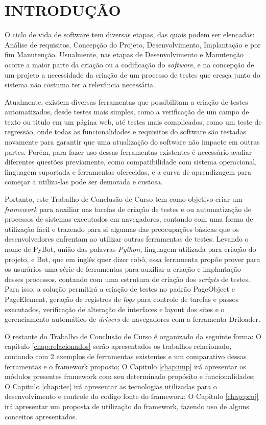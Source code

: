 %
%

\chapter{INTRODUÇÃO}\label{chap:introducao}

O ciclo de vida de software tem diversas etapas, das quais podem ser elencadas: Análise de requisitos, Concepção do Projeto, Desenvolvimento,
Implantação e por fim Manutenção. Usualmente, nas etapas de Desenvolvimento e Manutenção ocorre a maior parte da criação ou a codificação do
\textit{software}, e na concepção de um projeto a necessidade da criação de um processo de testes que cresça junto do sistema não costuma ter
a relevância necessária.

Atualmente, existem diversas ferramentas que possibilitam a criação de testes automatizados, desde testes mais simples, como a verificação de
um campo de texto ou titulo em um  página web, até testes mais complicados, como um teste de regressão, onde todas as funcionalidades e requisitos
do software são testadas novamente para garantir que uma atualização do software não impacte em outras partes. Porém, para fazer uso dessas
ferramentas existentes é necessário avaliar diferentes questões previamente, como compatibilidade com sistema operacional, linguagem suportada
e ferramentas oferecidas, e a curva de aprendizagem para começar a utiliza-las pode ser demorada e custosa.

Portanto, este Trabalho de Conclusão de Curso tem como objetivo criar um \textit{framework} para auxiliar nas tarefas de criação de testes e ou
automatização de processos de sistemas executados em navegadores, contando com uma forma de utilização fácil e trazendo para si algumas das
preocupações básicas que os desenvolvedores enfrentam ao utilizar outras ferramentas de testes. Levando o nome de PyBot, união das palavras \emph{Python},
linguagem utilizada para criação do projeto, e Bot, que em inglês quer dizer robô, essa ferramenta propõe prover para os usurários uma série de
ferramentas para auxiliar a criação e implantação desses processos, contando com uma estrutura de criação dos \emph{scripts} de testes. Para isso,
a solução permitirá a criação de testes no padrão PageObject e PageElement, geração de registros de \emph{logs} para controle de tarefas e passos
executados, verificação de alteração de interfaces e layout dos sites e o gerenciamento automático de \emph{drivers} de navegadores com a ferramenta Driloader.


O restante do Trabalho de Conclusão de Curso é organizado da seguinte forma:
O capítulo \ref{chap:relacionados} serão apresentados os trabalhos relacionado, contando com 2 exemplos de ferramentas existentes e um comparativo dessas ferramentas e o framework proposto;
O Capitulo \ref{chap:imp} irá apresentar os módulos presentes framework com seu determinado propósito e funcionalidades;
O Capitulo \ref{chap:tec} irá apresentar as tecnologias utilizadas para o desenvolvimento e controle do codigo fonte do framework;
O Capitulo \ref{chap:proj} irá apresentar um proposta de utilização do framework, fazendo uso de alguns conceitos apresentados.